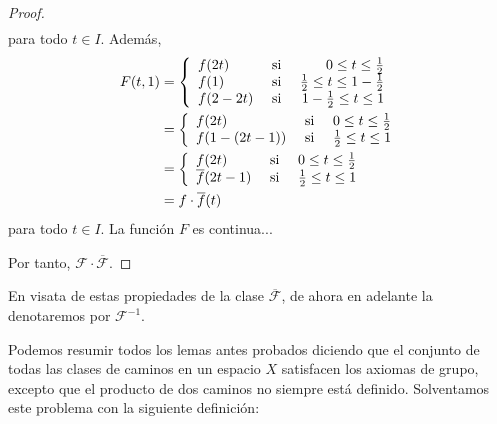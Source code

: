 \documentclass[12pt]{report}
\theoremstyle{largebreak}
\begin{document}
\begin{proof}
\begin{equation*}
\begin{split}
            \end{split}
        \end{equation*}
        para todo $t\in I$. Además,
        \begin{equation*}
            \begin{split}
                F(t,1)&=\left\{
                    \begin{array}{lcr}
                        f(2t) & \textup{ si } & 0\leq t\leq\frac{1}{2}\\
                        f(1) & \textup{ si } & \frac{1}{2}\leq t\leq1-\frac{1}{2}\\
                        f(2-2t) & \textup{ si } & 1-\frac{1}{2}\leq t\leq1\\
                    \end{array}
                \right.\\
                &=\left\{
                    \begin{array}{lcr}
                        f(2t) & \textup{ si } & 0\leq t\leq\frac{1}{2}\\
                        f(1-(2t-1)) & \textup{ si } & \frac{1}{2}\leq t\leq1\\
                    \end{array}
                \right.\\
                &=\left\{
                    \begin{array}{lcr}
                        f(2t) & \textup{ si } & 0\leq t\leq\frac{1}{2}\\
                        \overline{f}(2t-1) & \textup{ si } & \frac{1}{2}\leq t\leq1\\
                    \end{array}
                \right.\\
                &=f\cdot\overline{f}(t)\\
            \end{split}
        \end{equation*}
        para todo $t\in I$. La función $F$ es continua... %

        Por tanto, $\mathscr{F}\cdot\overline{\mathscr{F}}$.
    \end{proof}

    En visata de estas propiedades de la clase $\overline{\mathscr{F}}$, de ahora en adelante la denotaremos por $\mathscr{F}^{-1}$.

    Podemos resumir todos los lemas antes probados diciendo que el conjunto de todas las clases de caminos en un espacio $X$ satisfacen los axiomas de grupo, excepto que el producto de dos caminos no siempre está definido. Solventamos este problema con la siguiente definición:
\end{document}
